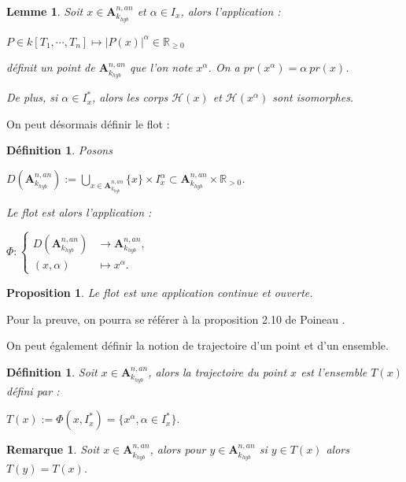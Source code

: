 \documentclass[11pt]{article}
\newcommand{\R}{\mathbb{R}}
\newcommand{\ana}{\mathbf{A}}
\newtheorem{prop}[thm]{Proposition}
\newtheorem{lem}[thm]{Lemme}
\newtheorem{defi}[thm]{Définition}
\newtheorem{rem}[thm]{Remarque}
\begin{document}
\begin{lem}
Soit $x \in \ana^{n,an}_{k_{hyb}}$ et $\alpha \in I_x$, alors l'application :
\begin{center}
$P \in k[T_1, \cdots, T_n] \mapsto |P(x)|^\alpha \in \R_{\geq 0}$ 
\end{center}
définit un point de $\ana^{n,an}_{k_{hyb}}$ que l'on note $x^\alpha$. On a $pr(x^\alpha) = \alpha ~ pr(x)$.

De plus, si $\alpha \in I^*_x$, alors les corps $\mathcal{H}(x)$ et $\mathcal{H}(x^\alpha)$ sont isomorphes.
\end{lem}

On peut désormais définir le flot :

\begin{defi}
Posons 
\begin{center}
$D(\ana^{n,an}_{k_{hyb}}) := \bigcup_{x \in \ana^{n,an}_{k_{hyb}}} \lbrace x\rbrace \times I_x^\alpha \subset \ana^{n,an}_{k_{hyb}} \times \R_{> 0}$.
\end{center}
Le flot est alors l'application :
\begin{center}
$\Phi : \begin{cases} 
		D(\ana^{n,an}_{k_{hyb}}) &\rightarrow \ana^{n,an}_{k_{hyb}},\\
		(x,\alpha)&\mapsto x^\alpha.
		\end{cases}$
\end{center}
\end{defi}

\begin{prop}
Le flot est une application continue et ouverte.
\end{prop}
Pour la preuve, on pourra se référer à la proposition 2.10 de Poineau \cite{PoineauCompactificationHybride}.

On peut également définir la notion de trajectoire d'un point et d'un ensemble.

\begin{defi}
Soit $x \in \ana^{n,an}_{k_{hyb}}$, alors la trajectoire du point $x$ est l'ensemble $T(x)$ défini par :
\begin{center}
$T(x) := \Phi(x, I_x^*) = \lbrace x^\alpha, \alpha \in I_x^*\rbrace.$ 
\end{center}
\end{defi}

\begin{rem}
Soit $x\in \ana^{n,an}_{k_{hyb}}$, alors pour $y \in \ana^{n,an}_{k_{hyb}}$ si $y \in T(x)$ alors $T(y) = T(x)$. 
\end{rem}
\end{document}
